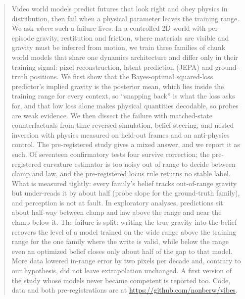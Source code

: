 \begin{abstract}
Video world models predict futures that look right and obey physics in distribution, then fail when
a physical parameter leaves the training range. We ask \emph{where} such a failure lives. In a
controlled 2D world with per-episode gravity, restitution and friction, where materials are visible
and gravity must be inferred from motion, we train three families of chunk world models that share
one dynamics architecture and differ only in their training signal: pixel reconstruction, latent
prediction (JEPA) and ground-truth positions. We first show that the Bayes-optimal squared-loss
predictor's implied gravity is the posterior mean, which lies inside the training range for every
context, so ``snapping back'' is what the loss asks for, and that low loss alone makes physical
quantities decodable, so probes are weak evidence. We then dissect the failure with matched-state
counterfactuals from time-reversed simulation, belief steering, and nested inversion with physics
measured on held-out frames and an anti-physics control. The pre-registered study gives a mixed
answer, and we report it as such. Of seventeen confirmatory tests four survive correction; the
pre-registered curvature estimator is too noisy out of range to decide between clamp and law, and
the pre-registered locus rule returns no stable label. What is measured tightly: every family's
belief tracks out-of-range gravity but under-reads it by about half (probe slope \StateInfHi{} for
the ground-truth family), and perception is not at fault. In exploratory analyses, predictions sit
about half-way between clamp and law above the range and near the clamp below it. The failure is
split: writing the true gravity into the belief recovers the level of a model trained on the wide
range above the training range for the one family where the write is valid, while below the range
even an optimized belief closes only about half of the gap to that model. More data lowered in-range
error by two pixels per decade and, contrary to our hypothesis, did not leave extrapolation
unchanged. A first version of the study whose models never became competent is reported too. Code,
data and both pre-registrations are at \url{https://github.com/nonberw/vibes}.
\end{abstract}
